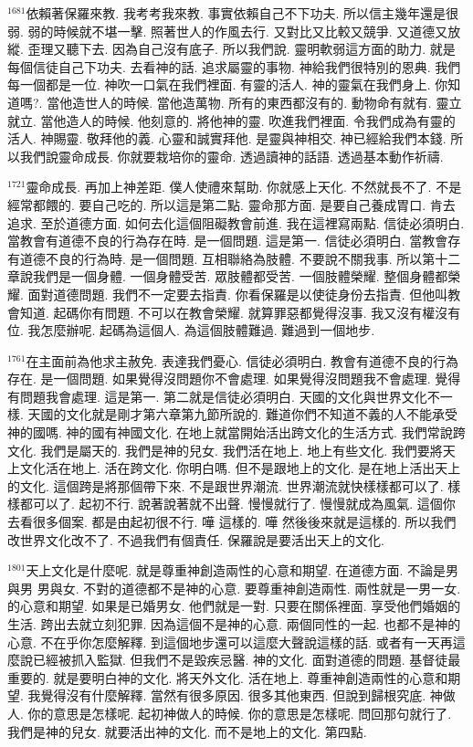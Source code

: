 \documentclass{book}
\begin{document}
$^{1681}$依賴著保羅來教.
我考考我來教.
事實依賴自己不下功夫.
所以信主幾年還是很弱.
弱的時候就不堪一擊.
照著世人的作風去行.
又對比又比較又競爭.
又道德又放縱.
歪理又聽下去.
因為自己沒有底子.
所以我們說.
靈明軟弱這方面的助力.
就是每個信徒自己下功夫.
去看神的話.
追求屬靈的事物.
神給我們很特別的恩典.
我們每一個都是一位.
神吹一口氣在我們裡面.
有靈的活人.
神的靈氣在我們身上.
你知道嗎?.
當他造世人的時候.
當他造萬物.
所有的東西都沒有的.
動物命有就有.
靈立就立.
當他造人的時候.
他刻意的.
將他神的靈.
吹進我們裡面.
令我們成為有靈的活人.
神賜靈.
敬拜他的義.
心靈和誠實拜他.
是靈與神相交.
神已經給我們本錢.
所以我們說靈命成長.
你就要栽培你的靈命.
透過讀神的話語.
透過基本動作祈禱.

$^{1721}$靈命成長.
再加上神差距.
僕人使禮來幫助.
你就感上天化.
不然就長不了.
不是經常都餵的.
要自己吃的.
所以這是第二點.
靈命那方面.
是要自己養成胃口.
肯去追求.
至於道德方面.
如何去化這個阻礙教會前進.
我在這裡寫兩點.
信徒必須明白.
當教會有道德不良的行為存在時.
是一個問題.
這是第一.
信徒必須明白.
當教會存有道德不良的行為時.
是一個問題.
互相聯絡為肢體.
不要說不關我事.
所以第十二章說我們是一個身體.
一個身體受苦.
眾肢體都受苦.
一個肢體榮耀.
整個身體都榮耀.
面對道德問題.
我們不一定要去指責.
你看保羅是以使徒身份去指責.
但他叫教會知道.
起碼你有問題.
不可以在教會榮耀.
就算罪惡都覺得沒事.
我又沒有權沒有位.
我怎麼辦呢.
起碼為這個人.
為這個肢體難過.
難過到一個地步.

$^{1761}$在主面前為他求主赦免.
表達我們憂心.
信徒必須明白.
教會有道德不良的行為存在.
是一個問題.
如果覺得沒問題你不會處理.
如果覺得沒問題我不會處理.
覺得有問題我會處理.
這是第一.
第二就是信徒必須明白.
天國的文化與世界文化不一樣.
天國的文化就是剛才第六章第九節所說的.
難道你們不知道不義的人不能承受神的國嗎.
神的國有神國文化.
在地上就當開始活出跨文化的生活方式.
我們常說跨文化.
我們是屬天的.
我們是神的兒女.
我們活在地上.
地上有些文化.
我們要將天上文化活在地上.
活在跨文化.
你明白嗎.
但不是跟地上的文化.
是在地上活出天上的文化.
這個跨是將那個帶下來.
不是跟世界潮流.
世界潮流就快樣樣都可以了.
樣樣都可以了.
起初不行.
說著說著就不出聲.
慢慢就行了.
慢慢就成為風氣.
這個你去看很多個案.
都是由起初很不行.
嘩 這樣的.
嘩 然後後來就是這樣的.
所以我們改世界文化改不了.
不過我們有個責任.
保羅說是要活出天上的文化.

$^{1801}$天上文化是什麼呢.
就是尊重神創造兩性的心意和期望.
在道德方面.
不論是男與男 男與女.
不對的道德都不是神的心意.
要尊重神創造兩性.
兩性就是一男一女.
的心意和期望.
如果是已婚男女.
他們就是一對.
只要在關係裡面.
享受他們婚姻的生活.
跨出去就立刻犯罪.
因為這個不是神的心意.
兩個同性的一起.
也都不是神的心意.
不在乎你怎麼解釋.
到這個地步還可以這麼大聲說這樣的話.
或者有一天再這麼說已經被抓入監獄.
但我們不是毀疾忌醫.
神的文化.
面對道德的問題.
基督徒最重要的.
就是要明白神的文化.
將天外文化.
活在地上.
尊重神創造兩性的心意和期望.
我覺得沒有什麼解釋.
當然有很多原因.
很多其他東西.
但說到歸根究底.
神做人.
你的意思是怎樣呢.
起初神做人的時候.
你的意思是怎樣呢.
問回那句就行了.
我們是神的兒女.
就要活出神的文化.
而不是地上的文化.
第四點.
\end{document}
